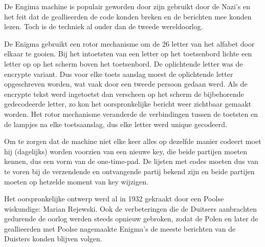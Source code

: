 De Engima machine is populair geworden door zijn gebruikt door de Nazi's en het feit dat de geallieerden de code konden breken en de berichten mee konden lezen. Toch is de techniek al ouder dan de tweede wereldoorlog.

De Enigma gebruikt een rotor mechanisme om de 26 letter van het alfabet door elkaar te gooien. Bij het intoetsten van een letter op het toetsenbord lichte een letter op op het scherm boven het toetsenbord. De oplichtende letter was de encrypte variant. Dus voor elke toets aanslag moest de oplichtende letter opgeschreven worden, wat vaak door een tweede persoon gedaan werd. Als de encrypte tekst werd ingetoetst dan verscheen op het scherm de bijbehorende gedecodeerde letter, zo kon het oorspronkelijke bericht weer zichtbaar gemaakt worden. Het rotor mechanisme veranderde de verbindingen tussen de toetsten en de lampjes na elke toetsaanslag, dus elke letter werd unique gecodeerd.

Om te zorgen dat de machine niet elke keer alles op dezelfde manier codeert moet hij (dagelijks) worden voorzien van een nieuwe key, die beide partijen moeten kennen, dus een vorm van de one-time-pad. De lijsten met codes moeten dus van te voren bij de verzendende en ontvangende partij bekend zijn en beide partijen moeten op hetzelde moment van key wijzigen.

Het oorspronkelijke ontwerp werd al in 1932 gekraakt door een Poolse wiskundige: Marian Rejewski. Ook de verbeteringen die de Duitsers aanbrachten gedurende de oorlog werden steeds opnieuw gebroken, zodat de Polen en later de geallieerden met Poolse nagemaakte Enigma's de meeste berichten van de Duisters konden blijven volgen.
